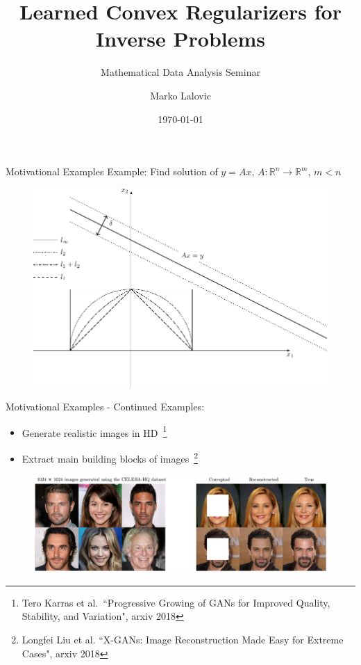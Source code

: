 \documentclass{beamer}
\title[Learned Convex Regularizers]{Learned Convex Regularizers for Inverse Problems}
\subtitle{Mathematical Data Analysis Seminar}
\author{Marko Lalovic}
\date{\today}
\begin{document}
\begin{frame}
    \titlepage 
\end{frame}

\begin{frame}{Motivational Examples}
Example: Find solution of $y = Ax$, $A: \mathbb{R}^{n} \rightarrow \mathbb{R}^{m}$, $m < n$
\begin{center}
\begin{figure}
\includegraphics[width=.99\textwidth]{../figures/norms-crop.pdf}
\end{figure}
\end{center}
\end{frame}

\begin{frame}{Motivational Examples - Continued}
Examples:
\begin{itemize}
\item Generate realistic images in HD~\footnote{{\tiny \color{blue} Tero Karras et al.\ ``Progressive Growing of GANs for Improved Quality, Stability, and Variation", arxiv 2018}}
\item Extract main building blocks of images~\footnote{{\tiny \color{blue} Longfei Liu et al. ``X-GANs: Image Reconstruction Made Easy for Extreme Cases", arxiv 2018}}
\end{itemize}
\begin{center}
\begin{figure}
\includegraphics[width=\textwidth]{../figures/output.pdf}
\end{figure}
\end{center}
\end{frame}
\end{document}
